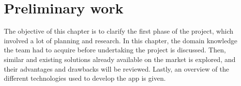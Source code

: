 \chapter{Preliminary work}

\label{sec:prestudy}
The objective of this chapter is to clarify the first phase of the project, which involved a lot of planning and research. In this chapter, the domain knowledge the team had to acquire before undertaking the project is discussed. Then, similar and existing solutions already available on the market is explored, and their advantages and drawbacks will be reviewed. Lastly, an overview of the different technologies used to develop the app is given.





